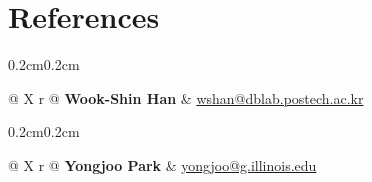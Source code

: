 \documentclass[10pt, letterpaper]{article}
\newenvironment{onecolentry}{
    \begin{adjustwidth}{0.2cm}{0.2cm}
}{
    \end{adjustwidth}
}
\begin{document}
\section{References}

\begin{onecolentry}
    \begin{tabularx}{\textwidth}{@{} X r @{}}
        \textbf{Wook-Shin Han} & \href{mailto:wshan@dblab.postech.ac.kr}{wshan@dblab.postech.ac.kr} \\[2pt] %
    \end{tabularx}
\end{onecolentry}

\vspace{0.2cm}

\begin{onecolentry}
    \begin{tabularx}{\textwidth}{@{} X r @{}}
        \textbf{Yongjoo Park} & \href{mailto:yongjoo@g.illinois.edu}{yongjoo@g.illinois.edu} \\[2pt]
    \end{tabularx}
\end{onecolentry}
\end{document}
